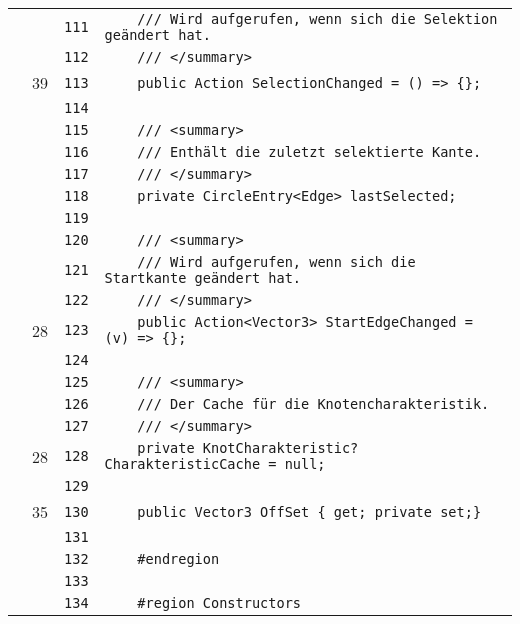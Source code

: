 \documentclass[a4paper,10pt]{article}
\begin{document}
\begin{longtable}[l]{lrrl}
\cellcolor{gray} &  & \verb~111~ & \verb~    /// Wird aufgerufen, wenn sich die Selektion geändert hat.~\\
\cellcolor{gray} &  & \verb~112~ & \verb~    /// </summary>~\\
\cellcolor{green} & 39 & \verb~113~ & \verb~    public Action SelectionChanged = () => {};~\\
\cellcolor{gray} &  & \verb~114~ & \verb~~\\
\cellcolor{gray} &  & \verb~115~ & \verb~    /// <summary>~\\
\cellcolor{gray} &  & \verb~116~ & \verb~    /// Enthält die zuletzt selektierte Kante.~\\
\cellcolor{gray} &  & \verb~117~ & \verb~    /// </summary>~\\
\cellcolor{gray} &  & \verb~118~ & \verb~    private CircleEntry<Edge> lastSelected;~\\
\cellcolor{gray} &  & \verb~119~ & \verb~~\\
\cellcolor{gray} &  & \verb~120~ & \verb~    /// <summary>~\\
\cellcolor{gray} &  & \verb~121~ & \verb~    /// Wird aufgerufen, wenn sich die Startkante geändert hat.~\\
\cellcolor{gray} &  & \verb~122~ & \verb~    /// </summary>~\\
\cellcolor{green} & 28 & \verb~123~ & \verb~    public Action<Vector3> StartEdgeChanged = (v) => {};~\\
\cellcolor{gray} &  & \verb~124~ & \verb~~\\
\cellcolor{gray} &  & \verb~125~ & \verb~    /// <summary>~\\
\cellcolor{gray} &  & \verb~126~ & \verb~    /// Der Cache für die Knotencharakteristik.~\\
\cellcolor{gray} &  & \verb~127~ & \verb~    /// </summary>~\\
\cellcolor{green} & 28 & \verb~128~ & \verb~    private KnotCharakteristic? CharakteristicCache = null;~\\
\cellcolor{gray} &  & \verb~129~ & \verb~~\\
\cellcolor{green} & 35 & \verb~130~ & \verb~    public Vector3 OffSet { get; private set;}~\\
\cellcolor{gray} &  & \verb~131~ & \verb~~\\
\cellcolor{gray} &  & \verb~132~ & \verb~    #endregion~\\
\cellcolor{gray} &  & \verb~133~ & \verb~~\\
\cellcolor{gray} &  & \verb~134~ & \verb~    #region Constructors~\\

\end{longtable}
\end{document}

